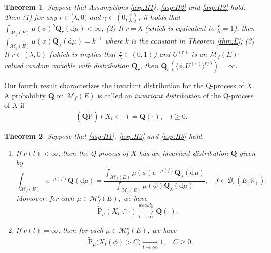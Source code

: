 \documentclass[12pt,a4paper]{amsart}
\numberwithin{equation}{section}
\theoremstyle{plain}
\newtheorem{thm}{Theorem}[section]
\theoremstyle{definition}
\theoremstyle{remark}
\begin{document}
\begin{thm}\label{thm:L}
	Suppose that Assumptions \eqref{asp:H1}, \eqref{asp:H2} and \eqref{asp:H3} hold.
	Then (1)
	for any $r\in [\lambda, 0)$ and $\gamma \in (0, \frac{r}{\lambda})$, it holds that $\int_{{\mathcal M}_f(E)}\mu(\phi)^\gamma\mathbf Q_r({\mathrm d}\mu)<\infty$;
	(2) If $r=\lambda$ (which is equivalent to $\frac{r}{\lambda}=1$), then $\int_{{\mathcal M}_f(E)}\mu(\phi)\mathbf Q_\lambda({\mathrm d}\mu) = k^{-1}$ where $k$ is  the constant in Theorem \ref{thm:E};
	(3) If $r\in (\lambda, 0)$ 
	(which is implies that $\frac{r}{\lambda}\in(0,1)$) and $U^{(r)}$ is an $\mathcal M_f(E)$-valued random variable with distribution $ \mathbf Q_r$, then $ \mathbf Q_r(\langle\phi, U^{(r)}\rangle^{r/\lambda})=\infty.$
\end{thm}

	Our fourth result characterizes the invariant distribution for the Q-process of $X$.
	A probability $\mathbf Q$ on $\mathcal M_f(E)$ is called an \emph{invariant distribution} of the Q-process of $X$ if
\[
	(\mathbf Q\widetilde{\mathrm P})(X_t \in \cdot )
	=\mathbf Q(\cdot),	\quad t\geq 0.
\]

\begin{thm}\label{thm:I}
	Suppose that \eqref{asp:H1}, \eqref{asp:H2} and \eqref{asp:H3} hold.
\begin{enumerate}
\item
	If $\nu(l)<\infty$, then the Q-process of $X$ has an invariant distribution $\mathbf Q$ given by
\[
	\int_{{\mathcal M}_f(E)} e^{-\mu(f)}\mathbf Q(\mathrm d\mu)
	=\frac{\int_{{\mathcal M}_f(E)}\mu(\phi)e^{-\mu(f)}\mathbf Q_\lambda({\mathrm d}\mu)} {\int_{{\mathcal M}_f(E)}\mu(\phi)\mathbf Q_\lambda({\mathrm d}\mu)}, \quad f\in \mathcal B_b(E, \mathbb R_+).
\]	
Moreover, for each $\mu\in\mathcal M^o_f(E)$, we have
\[
	\widetilde{\mathrm P}_\mu(X_t \in \cdot ) 
	\xrightarrow[t\to \infty]{weakly} {\mathbf Q}(\cdot).
\]
\item
	If $\nu(l) = \infty$, then for each $\mu \in \mathcal M^o_f(E)$, we have
\begin{align}
	& \widetilde{\mathrm P}_\mu\big(X_t(\phi) > C\big) 
	\xrightarrow[t\to \infty]{} 1, \quad C\geq 0.
\end{align}
\end{enumerate}
\end{thm}
\end{document}
